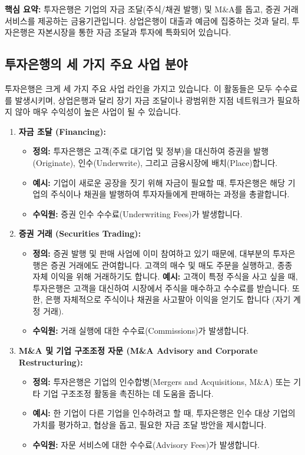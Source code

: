 \documentclass[11pt,a4paper]{book}
\theoremstyle{definition}
\begin{document}
\begin{summarybox}
\textbf{핵심 요약:} 투자은행은 기업의 자금 조달(주식/채권 발행) 및 M\&A를 돕고, 증권 거래 서비스를 제공하는 금융기관입니다. 상업은행이 대출과 예금에 집중하는 것과 달리, 투자은행은 자본시장을 통한 자금 조달과 투자에 특화되어 있습니다.
\end{summarybox}

\subsection{투자은행의 세 가지 주요 사업 분야}
투자은행은 크게 세 가지 주요 사업 라인을 가지고 있습니다. 이 활동들은 모두 수수료를 발생시키며, 상업은행과 달리 장기 자금 조달이나 광범위한 지점 네트워크가 필요하지 않아 매우 수익성이 높은 사업이 될 수 있습니다.

\begin{enumerate}
    \item \textbf{자금 조달 (Financing):}
    \begin{itemize}
        \item \textbf{정의:} 투자은행은 고객(주로 대기업 및 정부)을 대신하여 증권을 발행(Originate), 인수(Underwrite), 그리고 금융시장에 배치(Place)합니다.
        \item \textbf{예시:} 기업이 새로운 공장을 짓기 위해 자금이 필요할 때, 투자은행은 해당 기업의 주식이나 채권을 발행하여 투자자들에게 판매하는 과정을 총괄합니다.
        \item \textbf{수익원:} 증권 인수 수수료(Underwriting Fees)가 발생합니다.
    \end{itemize}

    \item \textbf{증권 거래 (Securities Trading):}
    \begin{itemize}
        \item \textbf{정의:} 증권 발행 및 판매 사업에 이미 참여하고 있기 때문에, 대부분의 투자은행은 증권 거래에도 관여합니다. 고객의 매수 및 매도 주문을 실행하고, 종종 자체 이익을 위해 거래하기도 합니다.
        \textbf{예시:} 고객이 특정 주식을 사고 싶을 때, 투자은행은 고객을 대신하여 시장에서 주식을 매수하고 수수료를 받습니다. 또한, 은행 자체적으로 주식이나 채권을 사고팔아 이익을 얻기도 합니다 (자기 계정 거래).
        \item \textbf{수익원:} 거래 실행에 대한 수수료(Commissions)가 발생합니다.
    \end{itemize}

    \item \textbf{M\&A 및 기업 구조조정 자문 (M\&A Advisory and Corporate Restructuring):}
    \begin{itemize}
        \item \textbf{정의:} 투자은행은 기업의 인수합병(Mergers and Acquisitions, M\&A) 또는 기타 기업 구조조정 활동을 촉진하는 데 도움을 줍니다.
        \item \textbf{예시:} 한 기업이 다른 기업을 인수하려고 할 때, 투자은행은 인수 대상 기업의 가치를 평가하고, 협상을 돕고, 필요한 자금 조달 방안을 제시합니다.
        \item \textbf{수익원:} 자문 서비스에 대한 수수료(Advisory Fees)가 발생합니다.
    \end{itemize}
\end{enumerate}
\end{document}
